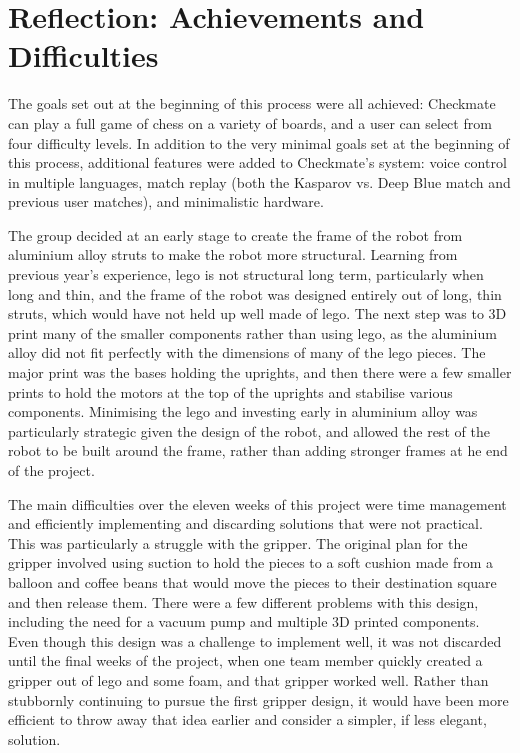 \documentclass[onecolumn]{IEEEtran}
\begin{document}
\section{Reflection: Achievements and Difficulties}
The goals set out at the beginning of this process were all achieved: Checkmate can play a full game of chess on a variety of boards, and a user can select from four difficulty levels. In addition to the very minimal goals set at the beginning of this process, additional features were added to Checkmate's system: voice control in multiple languages, match replay (both the Kasparov vs. Deep Blue match and previous user matches), and minimalistic hardware. \par
The group decided at an early stage to create the frame of the robot from aluminium alloy struts to make the robot more structural. Learning from previous year's experience, lego is not structural long term, particularly when long and thin, and the frame of the robot was designed entirely out of long, thin struts, which would have not held up well made of lego. The next step was to 3D print many of the smaller components rather than using lego, as the aluminium alloy did not fit perfectly with the dimensions of many of the lego pieces. The major print was the bases holding the uprights, and then there were a few smaller prints to hold the motors at the top of the uprights and stabilise various components. Minimising the lego and investing early in aluminium alloy was particularly strategic given the design of the robot, and allowed the rest of the robot to be built around the frame, rather than adding stronger frames at he end of the project. \par
The main difficulties over the eleven weeks of this project were time management and efficiently implementing and discarding solutions that were not practical. This was particularly a struggle with the gripper. The original plan for the gripper involved using suction to hold the pieces to a soft cushion made from a balloon and coffee beans that would move the pieces to their destination square and then release them. There were a few different problems with this design, including the need for a vacuum pump and multiple 3D printed components. Even though this design was a challenge to implement well, it was not discarded until the final weeks of the project, when one team member quickly created a gripper out of lego and some foam, and that gripper worked well. Rather than stubbornly continuing to pursue the first gripper design, it would have been more efficient to throw away that idea earlier and consider a simpler, if less elegant, solution. \par
\end{document}
